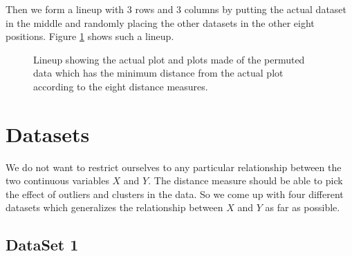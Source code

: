 \documentclass[12]{report}
\begin{document}
Then we form a lineup with 3 rows and 3 columns by putting the actual dataset in the middle and randomly placing the other datasets in the other eight positions. Figure \ref{minimum} shows such a lineup.

\begin{figure}[htbp]
   \centering
	\vspace{-.2in}
       \caption{Lineup showing the actual plot and plots made of the permuted data which has the minimum distance from the actual plot according to the eight distance measures.  }
       \label{minimum}
\end{figure}      

\section{Datasets}

We do not want to restrict ourselves to any particular relationship between the two continuous variables $X$ and $Y$. The distance measure should be able to pick the effect of outliers and clusters in the data. So we come up with four different datasets which generalizes the relationship between $X$ and $Y$ as far as possible. \\

\subsection{DataSet 1}
\end{document}
